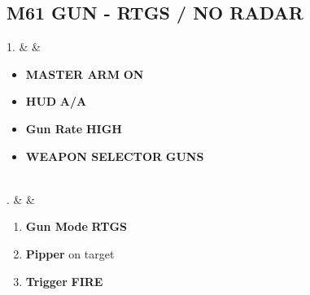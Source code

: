 \documentclass[fontInter]{TechCheck}
\begin{document}
	\subsection{M61 GUN - RTGS /  NO RADAR}
	\begin{listtabular}
		1. &  &
		\begin{minipage}[t]{\linewidth}
			\vspace{-7pt}
			\begin{itemize}
				\item \textbf{MASTER ARM} \dotfill \textbf{ON}
				\item \textbf{HUD} \dotfill \textbf{A/A}
				\item \textbf{Gun Rate} \dotfill \textbf{HIGH}
				\item \textbf{WEAPON SELECTOR} \dotfill \textbf{GUNS}
			\end{itemize}
		\end{minipage} \\
		. &  &
		\begin{minipage}[t]{\linewidth}
			\vspace{-7pt}
			\begin{enumerate}
				\item \textbf{Gun Mode} \dotfill \textbf{RTGS}
				\item \textbf{Pipper} \dotfill on target
				\item \textbf{Trigger} \dotfill \textbf{FIRE}
			\end{enumerate}
		\end{minipage} \\
	\end{listtabular}
\end{document}
